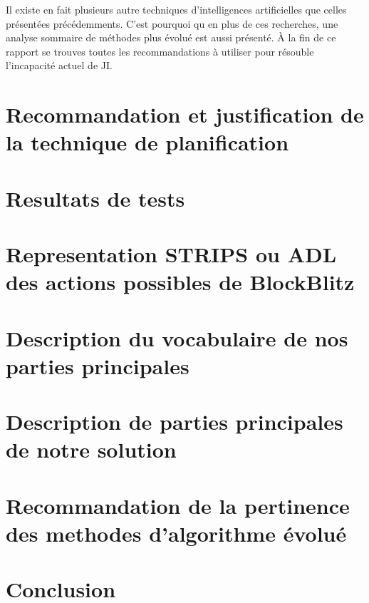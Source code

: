 \documentclass[12pt,english,frenchb,letterpaper]{article}
\begin{document}
Il existe en fait plusieurs autre techniques d'intelligences artificielles que celles présentées précédemments. C'est pourquoi qu en plus de ces recherches, une analyse sommaire de méthodes plus évolué est aussi présenté. À la fin de ce rapport se trouves toutes les recommandations à utiliser pour résouble l'incapacité actuel de JI.


\section{Recommandation et justification de la technique de planification}

\section{Resultats de tests}


\section{Representation STRIPS ou ADL des actions possibles de BlockBlitz}

\section{Description du vocabulaire de nos parties principales }

\section{Description de parties principales de notre solution}

\section{Recommandation de la pertinence des methodes d'algorithme évolué}

\section{Conclusion}
\end{document}
